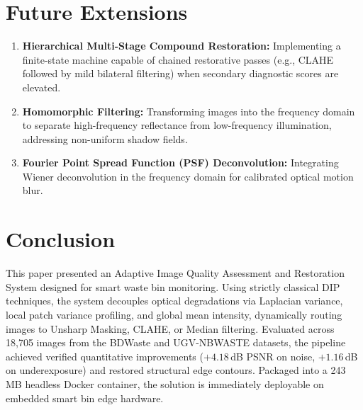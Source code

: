 \documentclass[conference]{IEEEtran}
\begin{document}
\section{Future Extensions}
\begin{enumerate}
    \item \textbf{Hierarchical Multi-Stage Compound Restoration:} Implementing a finite-state machine capable of chained restorative passes (e.g., CLAHE followed by mild bilateral filtering) when secondary diagnostic scores are elevated.
    \item \textbf{Homomorphic Filtering:} Transforming images into the frequency domain to separate high-frequency reflectance from low-frequency illumination, addressing non-uniform shadow fields.
    \item \textbf{Fourier Point Spread Function (PSF) Deconvolution:} Integrating Wiener deconvolution in the frequency domain for calibrated optical motion blur.
\end{enumerate}

\section{Conclusion}
This paper presented an Adaptive Image Quality Assessment and Restoration System designed for smart waste bin monitoring. Using strictly classical DIP techniques, the system decouples optical degradations via Laplacian variance, local patch variance profiling, and global mean intensity, dynamically routing images to Unsharp Masking, CLAHE, or Median filtering. Evaluated across 18,705 images from the BDWaste and UGV-NBWASTE datasets, the pipeline achieved verified quantitative improvements ($+4.18$\,dB PSNR on noise, $+1.16$\,dB on underexposure) and restored structural edge contours. Packaged into a 243\,MB headless Docker container, the solution is immediately deployable on embedded smart bin edge hardware.
\end{document}
